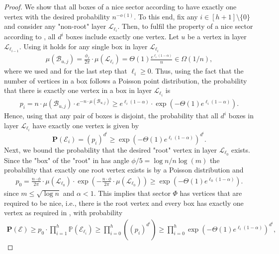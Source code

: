 \documentclass[letterpaper,11pt]{article}
\newcommand{\Prob}[1]{\mathbf{P}\left(#1\right)}
\newcommand{\Pro}[1]{\mathbb{P}\left(#1\right)}
\newcommand{\1}{\mathbb I}
\newcommand{\Layer}[1]{\mathcal{L}_{#1}}
\newcommand{\boxbelow}[2]{\mathcal{B}_{#1, #2}}
\begin{document}
\begin{proof}
 We show that all boxes of a nice sector according to  have exactly one vertex with the desired probability $n^{-o(1)}$. To this end, fix any $i \in [h+1]\setminus\{0\}$ and consider any "non-root" layer $\Layer{\ell_i}$. Then, to fulfil the property of a nice sector according to , all $d^i$ boxes include exactly one vertex. Let $u$ be a vertex in layer $\Layer{\ell_{i-1}}$. Using  it holds for any single box in layer $\Layer{\ell_i}$ 
    \begin{align*}
        \mu(\boxbelow{u}{j}) = \frac{\phi_{\ell}}{2\pi} \cdot \mu(\Layer{\ell_i}) = \Theta(1)\frac{e^{\ell_i(1-\alpha)}}{n} \in \Omega(1/n),
    \end{align*}
    where we used  and for the last step that $\ell_i \geq 0$. Thus, using the fact that the number of vertices in a box follows a Poisson point distribution, the probability that there is exactly one vertex in a box in layer $\Layer{\ell_i}$ is
    \begin{align}\label{eq:non-root-prob}
        p_i = n\cdot \mu(\boxbelow{u}{j}) \cdot e^{-n\cdot\mu(\boxbelow{u}{j})}\geq e^{\ell_i(1-\alpha)} \cdot \exp\left(-\Theta(1){e^{\ell_i(1-\alpha)}}\right).
    \end{align}
Hence, using that any pair of boxes is disjoint, the probability that all $d^i$ boxes in layer $\Layer{\ell_i}$ have exactly one vertex is given by
%
$$
\Prob{\mathcal{E}_{i}} = (p_i)^{d^i} \geq \exp\left(-\Theta(1){e^{\ell_i(1-\alpha)}}\right)^{d^i}.
$$
%
Next, we bound the probability that the desired "root" vertex in layer $\Layer{\ell_0}$ exists. Since the "box" of the "root" in  has angle $\phi/5 = \log n /n\log(m)$ the probability that exactly one root vertex exists is by a Poisson distribution and 
%
\begin{align}\label{eq:root-prob}
    p_0 = \frac{n\cdot\phi}{2\pi} \cdot \mu(\Layer{\ell_0})\cdot \exp{\left(-\frac{n\cdot\phi}{2\pi} \cdot \mu(\Layer{\ell_0})\right)} \geq \exp\left(-\Theta(1){e^{\ell_0(1-\alpha)}}\right).
\end{align}
%
since $m \leq \sqrt{\log n}$ and $\alpha < 1$. This implies that sector $\Phi$ has vertices that are required to be nice, i.e., there is the root vertex and every box has exactly one vertex as required in , with probability 
%
\begin{align*}
  \Prob{\mathcal{E}} \geq p_0 \cdot \prod_{i=1}^{h} \Pro{\mathcal{E}_{\ell_i}} \geq \prod_{i=0}^{h} \left((p_i)^{d^i}\right) \geq \prod_{i=0}^{h} \exp\left(-\Theta(1){e^{\ell_i(1-\alpha)}}\right)^{d^i},

\end{align*}
\end{proof}
\end{document}
